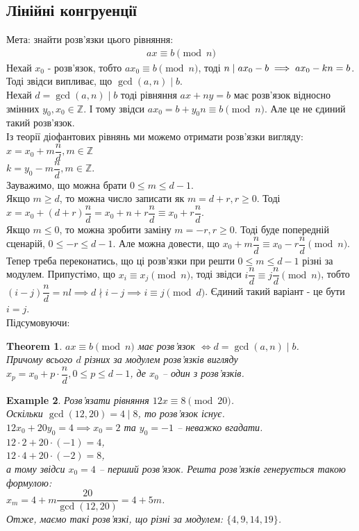 \documentclass[a4paper, 10pt]{article}
\theoremstyle{theoremdd}
\newtheorem{theorem}{Theorem}[subsection]
\theoremstyle{theoremdd}
\theoremstyle{theoremdd}
\theoremstyle{theoremdd}
\newtheorem{example}[theorem]{Example}
\theoremstyle{theoremdd}
\theoremstyle{theoremdd}
\theoremstyle{theoremdd}
\theoremstyle{theoremdd}
\begin{document}
\subsection{Лінійні конгруенції}
Мета: знайти розв'язки цього рівняння:
\begin{align*}
ax \equiv b \pmod n
\end{align*}
Нехай $x_0$ - розв'язок, тобто $ax_0 \equiv b \pmod n$, тоді $n \mid ax_0 - b \\ \implies ax_0 -kn = b$. Тоді звідси випливає, що $\gcd(a,n) \mid b$.
\bigskip \\
Нехай $d = \gcd(a,n) \mid b$ тоді рівняння $ax + ny = b$ має розв'язок відносно змінних $y_0,x_0 \in \mathbb{Z}$. І тому звідси $ax_0 = b + y_0 n \equiv b \pmod n$. Але це не єдиний такий розв'язок.
\bigskip \\
Із теорії діофантових рівнянь ми можемо отримати розв'язки вигляду:\\
$x = x_0 + m \dfrac{n}{d}, m \in \mathbb{Z}$\\
$k = y_0 - m \dfrac{n}{d}, m \in \mathbb{Z}$.\\
Зауважимо, що можна брати $0 \leq m \leq d-1$.\\
Якщо $m \geq d$, то можна число записати як $m = d+r, r \geq 0$. Тоді $x = x_0 + (d+r) \dfrac{n}{d} = x_0 + n + r \dfrac{n}{d} \equiv x_0 + r \dfrac{n}{d}$.\\
Якщо $m \leq 0$, то можна зробити заміну $m = -r, r \geq 0$. Тоді буде попередній сценарій, $0 \leq -r \leq d-1$. Але можна довести, що $x_0 + m \dfrac{n}{d} \equiv x_0 - r \dfrac{n}{d} \pmod n$.\\
Тепер треба переконатись, що ці розв'язки при решти $0 \leq m \leq d-1$ різні за модулем. Припустімо, що $x_i \equiv x_j \pmod n$, тоді звідси $i \dfrac{n}{d} \equiv j\dfrac{n}{d} \pmod n$, тобто $(i-j) \dfrac{n}{d} = nl \implies d \nmid i-j \implies i \equiv j \pmod d$. Єдиний такий варіант - це бути $i = j$.
\bigskip \\
Підсумовуючи:
\begin{theorem}
$ax \equiv b \pmod n$ має розв'язок $\iff d = \gcd(a,n) \mid b$.\\
Причому всього $d$ різних за модулем розв'язків вигляду \\
$x_p = x_0 + p \cdot \dfrac{n}{d}, 0 \leq p \leq d-1$, де $x_0$ -- один з розв'язків.
\end{theorem}

\begin{example}
Розв'язати рівняння $12 x \equiv 8 \pmod {20}$.\\
Оскільки $\gcd(12,20) = 4 \mid 8$, то розв'язок існує.\\
$12x_0 + 20y_0 = 4 \implies x_0 = 2$ та $y_0 = -1$ -- неважко вгадати.\\
$12 \cdot 2 + 20 \cdot (-1) = 4$,\\
$12 \cdot 4 + 20 \cdot (-2) = 8$,\\
а тому звідси $x_0=4$ -- перший розв'язок. Решта розв'язків генерується такою формулою:\\
$x_m = 4 + m\dfrac{20}{\gcd (12,20)} = 4 + 5m$.\\
Отже, маємо такі розв'язкі, що різні за модулем: $\{4,9,14,19\}$.
\end{example}
\end{document}
